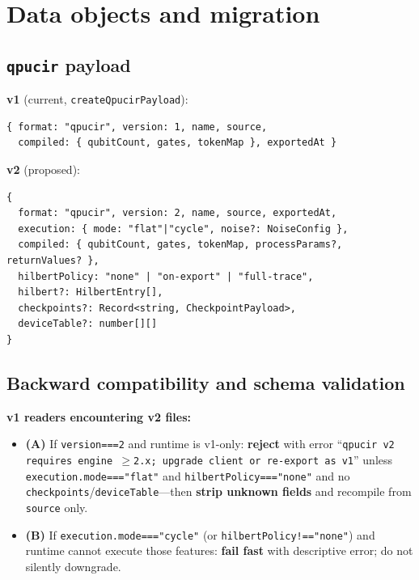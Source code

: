 \documentclass[11pt,a4paper]{article}
\begin{document}
\section{Data objects and migration}
\label{sec:exports}

\subsection{\texttt{qpucir} payload}

\textbf{v1} (current, \texttt{createQpucirPayload}):
\begin{lstlisting}[style=protocol]
{ format: "qpucir", version: 1, name, source,
  compiled: { qubitCount, gates, tokenMap }, exportedAt }
\end{lstlisting}

\textbf{v2} (proposed):
\begin{lstlisting}[style=protocol]
{
  format: "qpucir", version: 2, name, source, exportedAt,
  execution: { mode: "flat"|"cycle", noise?: NoiseConfig },
  compiled: { qubitCount, gates, tokenMap, processParams?, returnValues? },
  hilbertPolicy: "none" | "on-export" | "full-trace",
  hilbert?: HilbertEntry[],
  checkpoints?: Record<string, CheckpointPayload>,
  deviceTable?: number[][]
}
\end{lstlisting}

\subsection{Backward compatibility and schema validation}

\textbf{v1 readers encountering v2 files:}
\begin{itemize}
  \item \textbf{(A)} If \texttt{version===2} and runtime is v1-only: \textbf{reject} with error ``\texttt{qpucir v2 requires engine $\geq$2.x; upgrade client or re-export as v1}'' unless \texttt{execution.mode==="flat"} and \texttt{hilbertPolicy==="none"} and no \texttt{checkpoints}/\texttt{deviceTable}---then \textbf{strip unknown fields} and recompile from \texttt{source} only.
  \item \textbf{(B)} If \texttt{execution.mode==="cycle"} (or \texttt{hilbertPolicy!=="none"}) and runtime cannot execute those features: \textbf{fail fast} with descriptive error; do not silently downgrade.
\end{itemize}
\end{document}

